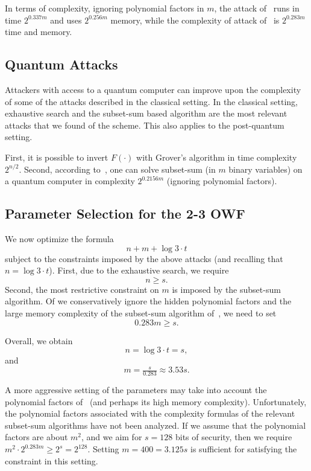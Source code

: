 \documentclass{article}
\begin{document}
In terms of complexity, ignoring polynomial factors in $m$,
the attack of~\cite{Howgrave-GrahamJ10} runs in time $2^{0.337m}$ and uses $2^{0.256m}$ memory,
while the complexity of attack of~\cite{BonnetainBSS20} is $2^{0.283m}$ time and memory.


\subsection{Quantum Attacks}

Attackers with access to a quantum computer can improve upon the complexity of some of the attacks described in the classical setting. In the classical setting, exhaustive search and the subset-sum based algorithm are the most relevant attacks that we found of the scheme. This also applies to the post-quantum setting.

First, it is possible to invert $F(\cdot)$ with Grover's algorithm in time complexity $2^{n/2}$. Second, according to~\cite{BonnetainBSS20}, one can solve subset-sum (in $m$ binary variables) on a quantum computer in complexity $2^{0.2156 m}$ (ignoring polynomial factors).


\subsection{Parameter Selection for the 2-3 OWF}

We now optimize the formula
$$n+m+ \log 3 \cdot t$$
subject to the constraints imposed by the above attacks
(and recalling that $n = \log 3 \cdot t $).
First, due to the exhaustive search, we require $$n \geq s.$$
Second,
the most restrictive constraint on $m$ is imposed by the subset-sum algorithm.
Of we conservatively ignore the hidden polynomial factors and the large memory
complexity of the subset-sum algorithm of~\cite{BonnetainBSS20}, we need to set
$$0.283m \geq s.$$

Overall, we obtain
$$n = \log 3 \cdot t = s,$$
and $$m = \tfrac{s}{0.283} \approx 3.53 s.$$

A more aggressive setting of the parameters may take into account the polynomial factors of~\cite{BonnetainBSS20} (and perhaps its high memory complexity). Unfortunately, the polynomial factors associated with the complexity formulas of the relevant subset-sum algorithms have not been analyzed.
If we assume that the polynomial factors are about $m^2$, and we aim for $s = 128$ bits of security, then
we require $m^2 \cdot 2^{0.283m} \geq 2^{s} = 2^{128}$. Setting $m = 400 = 3.125 s$ is sufficient for satisfying the constraint in this setting.
\end{document}
